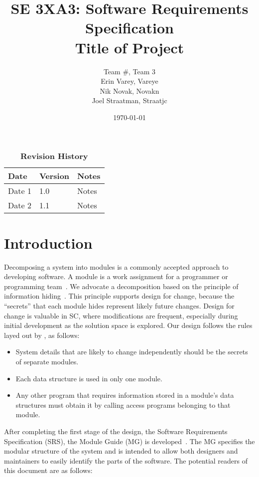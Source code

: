 \documentclass[12pt, titlepage]{article}
\title{SE 3XA3: Software Requirements Specification\\Title of Project}
\author{Team \#, Team 3
		\\ Erin Varey, Vareye
		\\ Nik Novak, Novakn
		\\ Joel Straatman, Straatjc
}
\date{\today}
\begin{document}
\maketitle
{}
\tableofcontents
\listoftables
\listoffigures
\begin{table}[bp]
\caption{\bf Revision History}
\begin{tabularx}{\textwidth}{p{3cm}p{2cm}X}
\toprule {\bf Date} & {\bf Version} & {\bf Notes}\\
\midrule
Date 1 & 1.0 & Notes\\
Date 2 & 1.1 & Notes\\
\bottomrule
\end{tabularx}
\end{table}
\newpage
{}
\section{Introduction}
Decomposing a system into modules is a commonly accepted approach to developing
software.  A module is a work assignment for a programmer or programming
team~\citep{ParnasEtAl1984}.  We advocate a decomposition
based on the principle of information hiding~\citep{Parnas1972a}.  This
principle supports design for change, because the ``secrets'' that each module
hides represent likely future changes.  Design for change is valuable in SC,
where modifications are frequent, especially during initial development as the
solution space is explored.  
Our design follows the rules layed out by \citet{ParnasEtAl1984}, as follows:
\begin{itemize}
\item System details that are likely to change independently should be the
  secrets of separate modules.
\item Each data structure is used in only one module.
\item Any other program that requires information stored in a module's data
  structures must obtain it by calling access programs belonging to that module.
\end{itemize}
After completing the first stage of the design, the Software Requirements
Specification (SRS), the Module Guide (MG) is developed~\citep{ParnasEtAl1984}. The MG
specifies the modular structure of the system and is intended to allow both
designers and maintainers to easily identify the parts of the software.  The
potential readers of this document are as follows:
\end{document}
